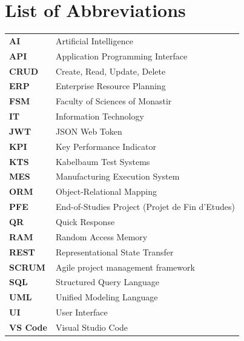 \chapter*{List of Abbreviations}

\begin{longtable}{p{3cm} p{12cm}}

\textbf{AI} & Artificial Intelligence \\[0.3cm]

\textbf{API} & Application Programming Interface \\[0.3cm]

\textbf{CRUD} & Create, Read, Update, Delete \\[0.3cm]

\textbf{ERP} & Enterprise Resource Planning \\[0.3cm]

\textbf{FSM} & Faculty of Sciences of Monastir \\[0.3cm]

\textbf{IT} & Information Technology \\[0.3cm]

\textbf{JWT} & JSON Web Token \\[0.3cm]

\textbf{KPI} & Key Performance Indicator \\[0.3cm]

\textbf{KTS} & Kabelbaum Test Systems \\[0.3cm]

\textbf{MES} & Manufacturing Execution System \\[0.3cm]

\textbf{ORM} & Object-Relational Mapping \\[0.3cm]

\textbf{PFE} & End-of-Studies Project (Projet de Fin d'Etudes) \\[0.3cm]

\textbf{QR} & Quick Response \\[0.3cm]

\textbf{RAM} & Random Access Memory \\[0.3cm]

\textbf{REST} & Representational State Transfer \\[0.3cm]

\textbf{SCRUM} & Agile project management framework \\[0.3cm]

\textbf{SQL} & Structured Query Language \\[0.3cm]

\textbf{UML} & Unified Modeling Language \\[0.3cm]

\textbf{UI} &  User Interface \\[0.3cm]

\textbf{VS Code} & Visual Studio Code \\[0.3cm]

\end{longtable}